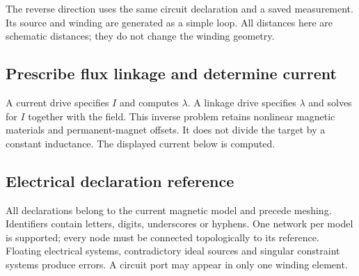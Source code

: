 The reverse direction uses the same circuit declaration and a saved measurement.
Its source and winding are generated as a simple loop. All distances here are
schematic distances; they do not change the winding geometry.
\begin{codeexample}[]
\end{codeexample}

\subsection{Prescribe flux linkage and determine current}
A current drive specifies $I$ and computes $\lambda$. A linkage drive specifies
$\lambda$ and solves for $I$ together with the field. This inverse problem retains
nonlinear magnetic materials and permanent-magnet offsets. It does not divide
the target by a constant inductance. The displayed current below is computed.
\begin{codeexample}[width=0pt]
\end{codeexample}

\subsection{Electrical declaration reference}
\label{sec:network-keys}
All declarations belong to the current magnetic model and precede meshing.
Identifiers contain letters, digits, underscores or hyphens. One network per
model is supported; every node must be connected topologically to its reference.
Floating electrical systems, contradictory ideal sources and singular constraint
systems produce errors. A circuit port may appear in only one winding element.


